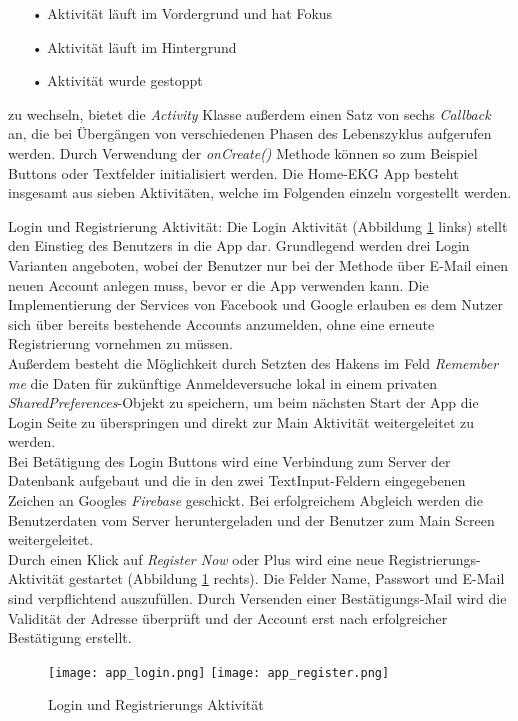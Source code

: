 \begin{itemize}
	\item[•] Aktivität läuft im Vordergrund und hat Fokus
	\item[•] Aktivität läuft im Hintergrund
	\item[•] Aktivität wurde gestoppt
\end{itemize}

zu wechseln, bietet die \textit{Activity} Klasse außerdem einen Satz von sechs \textit{Callback} an, die bei Übergängen von verschiedenen Phasen des Lebenszyklus aufgerufen werden. Durch Verwendung der \textit{onCreate()} Methode können so zum Beispiel Buttons oder Textfelder initialisiert werden.
Die Home-EKG App besteht insgesamt aus sieben Aktivitäten, welche im Folgenden einzeln vorgestellt werden.


Login und Registrierung Aktivität: Die Login Aktivität (Abbildung \ref{app_login_reg} links) stellt den Einstieg des Benutzers in die App dar. Grundlegend werden drei Login Varianten angeboten, wobei der Benutzer nur bei der Methode über E-Mail einen neuen Account anlegen muss, bevor er die App verwenden kann. Die Implementierung der Services von Facebook und Google erlauben es dem Nutzer sich über bereits bestehende Accounts anzumelden, ohne eine erneute Registrierung vornehmen zu müssen. \\
Außerdem besteht die Möglichkeit durch Setzten des Hakens im Feld \textit{Remember me} die Daten für zukünftige Anmeldeversuche lokal in einem privaten \textit{SharedPreferences}-Objekt zu speichern, um beim nächsten Start der App die Login Seite zu überspringen und direkt zur Main Aktivität weitergeleitet zu werden. \\
Bei Betätigung des Login Buttons wird eine Verbindung zum Server der Datenbank aufgebaut und die in den zwei TextInput-Feldern eingegebenen Zeichen an Googles \textit{Firebase} geschickt. Bei erfolgreichem Abgleich werden die Benutzerdaten vom Server heruntergeladen und der Benutzer zum Main Screen weitergeleitet. \\
Durch einen Klick auf \textit{Register Now} oder Plus wird eine neue Registrierungs-Aktivität gestartet (Abbildung \ref{app_login_reg} rechts). Die Felder Name, Passwort und E-Mail sind verpflichtend auszufüllen. Durch Versenden einer Bestätigungs-Mail wird die Validität der Adresse überprüft und der Account erst nach erfolgreicher Bestätigung erstellt.
	\begin{figure} [!h]
		\begin{center}
			\texttt{[image: app\_login.png]}
			\hspace{1.5 cm}
			\texttt{[image: app\_register.png]}
		\end{center}
		\caption{Login und Registrierungs Aktivität}
		\label{app_login_reg}
	\end{figure}


